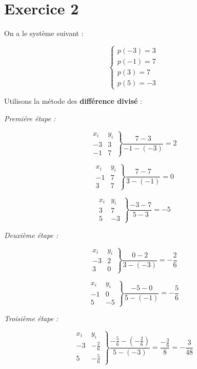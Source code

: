 \documentclass[12pt, letterpaper]{article}
\begin{document}
\section*{Exercice 2}

On a le système suivant :

$$
\left\{
\begin{array}{l}
  p(-3) = 3 \\
  p(-1) = 7 \\
  p(3) = 7 \\
  p(5) = -3
\end{array}
\right.
$$

Utilisons la métode des \textbf{différence divisé} :

\textit{Premiére étape :}

$$
\left.
\begin{array}{ll}
  x_i & y_i \\
  -3 & 3 \\
  -1 & 7
\end{array}
\right\}
\frac{7 - 3}{-1 - (-3)} = 2
$$

$$
\left.
\begin{array}{ll}
  x_i & y_i \\
  -1 & 7 \\
  3 & 7
\end{array}
\right\}
\frac{7 - 7}{3 - (-1)} = 0
$$

$$
\left.
\begin{array}{ll}
  x_i & y_i \\
  3 & 7 \\
  5 & -3
\end{array}
\right\}
\frac{-3 - 7}{5 - 3} = -5
$$

\textit{Deuxième étape :}

$$
\left.
\begin{array}{ll}
  x_i & y_i \\
  -3 & 2 \\
  3 & 0
\end{array}
\right\}
\frac{0 - 2}{3 -(- 3)} = -\frac{2}{6}
$$

$$
\left.
\begin{array}{ll}
  x_i & y_i \\
  -1 & 0 \\
  5 & -5
\end{array}
\right\}
\frac{-5 - 0}{5 -(- 1)} = -\frac{5}{6}
$$

\textit{Troisième étape :}

$$
\left.
\begin{array}{ll}
  x_i & y_i \\
  -3 & -\frac{2}{6} \\
  5 & -\frac{5}{6}
\end{array}
\right\}
\frac{-\frac{5}{6} - (-\frac{2}{6})}{5 -(- 3)} =
\frac{-\frac{3}{6}}{8} = -\frac{3}{48}
$$
\end{document}
